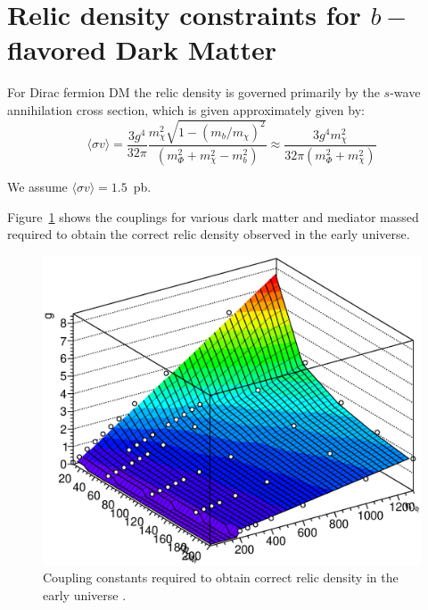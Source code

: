 \section{\texorpdfstring{Relic density constraints for $b-$flavored Dark Matter}{Relic density constraints for b-flavored Dark Matter}}
\label{app:Relic_Density_bFDM}

For Dirac fermion DM the relic density is governed primarily by the $s$-wave annihilation cross section, which is given approximately given by:
\begin{equation}
\langle \sigma v \rangle = \frac{3g^4}{32\pi} \frac{m^2_\chi \sqrt{1-(m_b/m_\chi)^2}}{\left( m^2_\Phi+m^2_\chi-m^2_b \right)} \approx \frac{3g^4 m^2_\chi}{32\pi (m^2_\Phi+m^2_\chi)}
\end{equation}

We assume $ \langle \sigma v \rangle=1.5$~pb. 


Figure~\ref{fig:relic_weights} shows the couplings for various dark matter and mediator massed required to obtain the correct relic density observed in the early universe.

\begin{figure}[h!]
	\centering 
	\includegraphics[scale=0.5]{figures/bFDM/relic_weights.eps}
	\caption{Coupling constants required to obtain correct relic density in the early universe . \label{fig:relic_weights}}
	\end{figure}	
	
